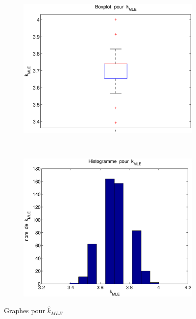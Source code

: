 \begin{figure}[!ht]
        \centering
        \begin{subfigure}[b]{0.5\textwidth}
                \includegraphics[width=\textwidth]{graphes/boxplot_kmle.eps}
        \end{subfigure}%
        ~
        \begin{subfigure}[b]{0.5\textwidth}
                \includegraphics[width=\textwidth]{graphes/hist_kmle.eps}
        \end{subfigure}
        \caption{Graphes pour $\hat{k}_{MLE}$}\label{fig:kmle}
\end{figure}

